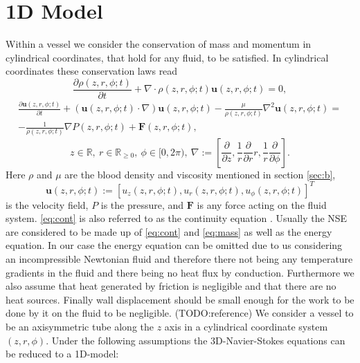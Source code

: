 \documentclass[a4paper, oneside]{discothesis}
\begin{document}
\section{1D Model} \label{sec:sv}
Within a vessel we consider the conservation of mass and momentum in cylindrical coordinates, that hold for any fluid, to be satisfied.
In cylindrical coordinates these conservation laws read
\begin{equation}
	\frac{\partial \rho (z,r,\phi; t)}{\partial t} + \nabla \cdot \rho (z,r,\phi; t)\mathbf{u}(z,r,\phi; t) = 0, \label{eq:cont}
\end{equation}
\begin{multline}
	\frac{\partial \mathbf{u}(z,r,\phi; t)}{\partial t} + \left( \mathbf{u}(z,r,\phi; t) \cdot \nabla \right) \mathbf{u}(z,r,\phi; t) - \frac{\mu}{\rho(z,r,\phi; t)} \nabla^2 \mathbf{u}(z,r,\phi; t) = \\
														- \frac{1}{\rho (z,r,\phi; t)} \nabla P(z,r,\phi; t) + \mathbf{F}(z,r,\phi; t), \label{eq:mass} 
\end{multline}
\begin{equation}
	z \in \mathbb{R}, \ r \in \mathbb{R}_{\geq 0}, \ \phi \in [0, 2\pi), \ \nabla := \left[\frac{\partial}{\partial z}, \frac{1}{r}\frac{\partial}{\partial r}r, \frac{1}{r}\frac{\partial}{\partial \phi}  \right].
\end{equation}
Here $\rho$ and $\mu$ are the blood density and viscosity mentioned in section \ref{sec:b}, 
\begin{equation}
	\mathbf{u}(z,r,\phi; t) := \left[ u_z(z,r,\phi; t), u_r(z,r,\phi; t), u_\phi (z,r,\phi; t) \right]^T
\end{equation}
is the velocity field, $P$ is the pressure, and $\mathbf{F}$ is any force acting on the fluid system.
\autoref{eq:cont} is also referred to as the continuity equation \cite{anderson2011ebook}.
Usually the NSE are considered to be made up of \autoref{eq:cont} and \autoref{eq:mass} as well as the energy equation.
In our case the energy equation can be omitted due to us considering an incompressible Newtonian fluid and therefore there not being any temperature gradients in the fluid and there being no heat flux by conduction.
Furthermore we also assume that heat generated by friction is negligible and that there are no heat sources.
Finally wall displacement should be small enough for the work to be done by it on the fluid to be negligible. (TODO:reference)
We consider a vessel to be an axisymmetric tube along the $z$ axis in a cylindrical coordinate system $\left(z,r,\phi\right)$.
Under the following assumptions the 3D-Navier-Stokes equations can be reduced to a 1D-model:
\end{document}
